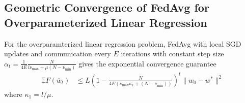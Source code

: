 \subsection{Geometric Convergence of FedAvg for Overparameterized Linear Regression}
	
	\begin{thm}
		For the overparamterized linear regression problem, FedAvg with local
		SGD updates and communication every $E$ iterations with constant
		step size $\alpha_{t}=\frac{1}{4E}\frac{N}{l\nu_{\max}+\mu(N-\nu_{\min})}$
		gives the exponential convergence guarantee 
		\begin{align*}
		\mathbb{E}F(\overline{w}_{t}) & \leq L(1-\frac{N}{4E(\nu_{\max}\kappa_{1}+(N-\nu_{\min}))})^{t}\|w_{0}-w^{\ast}\|^{2}
		\end{align*}
		where $\kappa_{1}=l/\mu$. 
	\end{thm}
